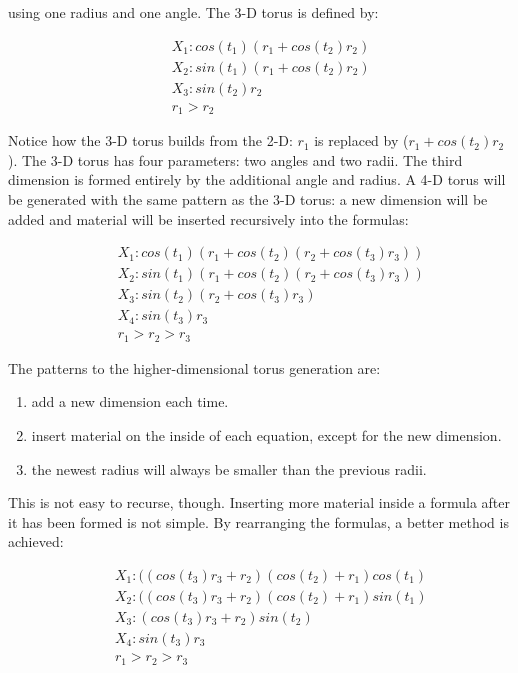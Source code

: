 \documentclass[a4paper]{report}
\begin{document}
\begin{article}
\noindent using one radius and one angle. The 3-D torus is defined by:

\begin{eqnarray*}
&&X_1: cos(t_1)(r_1 + cos(t_2)r_2)\\
&&X_2: sin(t_1)(r_1 + cos(t_2)r_2)\\
&&X_3: sin(t_2)r_2\\
&&r_1>r_2
\end{eqnarray*}

Notice how the 3-D torus builds from the 2-D: $r_1$ is replaced by
($r_1+cos(t_2)r_2$). The 3-D torus has four parameters: two angles and
two radii. The third dimension is formed entirely by the additional
angle and radius.  A 4-D torus will be generated with the same pattern
as the 3-D torus: a new dimension will be added and material will be
inserted recursively into the formulas:

\begin{eqnarray*}
&&X_1: cos(t_1)(r_1 + cos(t_2)(r_2 + cos(t_3)r_3))\\
&&X_2: sin(t_1)(r_1 + cos(t_2)(r_2 + cos(t_3)r_3))\\
&&X_3: sin(t_2)(r_2 + cos(t_3)r_3)\\
&&X_4: sin(t_3)r_3\\
&&r_1>r_2>r_3
\end{eqnarray*}

The patterns to the higher-dimensional torus generation are:

\begin{enumerate} \itemsep 0in
\item add a new dimension each time.
\item insert material on the inside of each equation, except for the
  new dimension.
\item the newest radius will always be smaller than the previous radii.
\end{enumerate}

This is not easy to recurse, though. Inserting more material inside a
formula after it has been formed is not simple. By rearranging the
formulas, a better method is achieved:

\begin{eqnarray*}
&&X_1: ((cos(t_3)r_3 + r_2)(cos(t_2) + r_1)cos(t_1)\\
&&X_2: ((cos(t_3)r_3 + r_2)(cos(t_2) + r_1)sin(t_1)\\
&&X_3:  (cos(t_3)r_3 + r_2) sin(t_2)\\
&&X_4:   sin(t_3)r_3\\
&&r_1>r_2>r_3
\end{eqnarray*}


\end{article}
\end{document}
